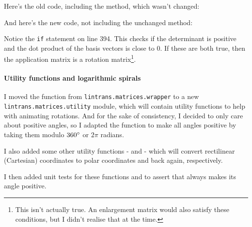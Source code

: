 \documentclass[../development.tex]{subfiles}
\begin{document}
Here's the old code, including the  method, which wasn't changed:


And here's the new code, not including the unchanged  method:


Notice the \texttt{if} statement on line 394. This checks if the determinant is positive and the dot product of the basis vectors is close to 0. If these are both true, then the application matrix is a rotation matrix\footnote{This isn't actually true. An enlargement matrix would also satisfy these conditions, but I didn't realise that at the time.}.

\paragraph{Utility functions and logarithmic spirals\label{development:making-v0.2.2:animating-rotations:utility-functions-and-logarithmic-spirals}}

I moved the  function from \texttt{lintrans.matrices.wrapper} to a new \texttt{lintrans.matrices.utility} module, which will contain utility functions to help with animating rotations. And for the sake of consistency, I decided to only care about positive angles, so I adapted the function to make all angles positive by taking them modulo $360\degree$ or $2\pi$ radians.

I also added some other utility functions -  and  - which will convert rectilinear (Cartesian) coordinates to polar coordinates and back again, respectively.


I then added unit tests for these functions and to assert that  always makes its angle positive.



\end{document}
